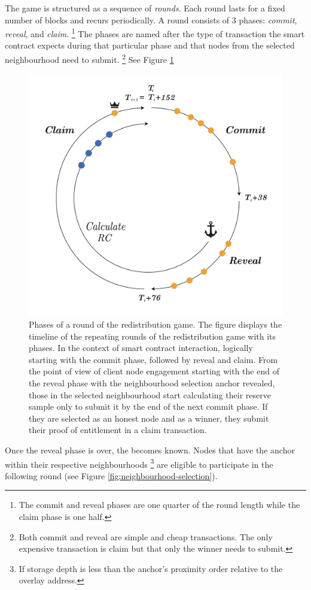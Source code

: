 The game is structured as a sequence of \emph{rounds}. Each round lasts for a fixed number of blocks and recurs periodically. A round consists of 3 phases: \emph{commit}, \emph{reveal}, and \emph{claim}.%
%
\footnote{The commit and reveal phases are one quarter of the round length while the claim phase is one half.
}
%
The phases are named after the type of transaction the smart contract expects during that particular phase and that nodes from the selected neighbourhood need to submit.%
%
\footnote{Both commit and reveal are simple and cheap transactions. The only expensive transaction is claim but that only the winner needs to submit.}
%
See Figure \ref{fig:phases}

\begin{figure}[!ht]
  \centering
    \includegraphics[width=.5\textwidth]{fig/round-lifecycle.pdf}
  \caption[Phases of a round of the redistribution game]{Phases of a round of the redistribution game. The figure displays the timeline of the repeating rounds of the redistribution game with its phases. In the context of smart contract interaction, logically starting with the commit phase, followed by reveal and claim. From the point of view of client node engagement starting with the end of the reveal phase with the neighbourhood selection anchor revealed, those in the selected neighbourhood start calculating their reserve sample only to submit it by the end of the next commit phase. If they are selected as an honest node and as a winner, they submit their proof of entitlement in a claim transaction.}
\label{fig:phases}
\end{figure}    

Once the reveal phase is over, the   becomes known. Nodes that have the anchor within their respective neighbourhoods%
%
\footnote{If storage depth is less than the anchor's proximity order relative to the overlay address.}
%
are  eligible to participate in the following round (see Figure \ref{fig:neighbourhood-selection}).



